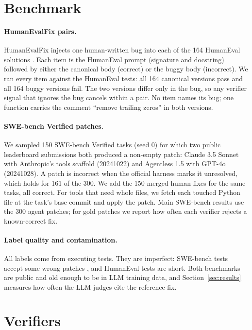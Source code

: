 \section{Benchmark}
\label{sec:bench}

\paragraph{HumanEvalFix pairs.}
HumanEvalFix \citep{muennighoff2024octopack} injects one human-written bug into each of the 164 HumanEval solutions \citep{chen2021humaneval}. Each item is the HumanEval prompt (signature and docstring) followed by either the canonical body (correct) or the buggy body (incorrect). We ran every item against the HumanEval tests: all 164 canonical versions pass and all 164 buggy versions fail. The two versions differ only in the bug, so any verifier signal that ignores the bug cancels within a pair. No item names its bug; one function carries the comment ``remove trailing zeros'' in both versions.

\paragraph{SWE-bench Verified patches.}
We sampled 150 SWE-bench Verified tasks \citep{jimenez2024swebench,openai2024sweverified} (seed 0) for which two public leaderboard submissions both produced a non-empty patch: Claude 3.5 Sonnet with Anthropic's tools scaffold (20241022) and Agentless 1.5 with GPT-4o (20241028). A patch is incorrect when the official harness marks it unresolved, which holds for 161 of the 300. We add the 150 merged human fixes for the same tasks, all correct. For tools that need whole files, we fetch each touched Python file at the task's base commit and apply the patch. Main SWE-bench results use the 300 agent patches; for gold patches we report how often each verifier rejects a known-correct fix.

\paragraph{Label quality and contamination.}
All labels come from executing tests. They are imperfect: SWE-bench tests accept some wrong patches \citep{patchdiff2025,utboost2025}, and HumanEval tests are short. Both benchmarks are public and old enough to be in LLM training data, and Section~\ref{sec:results} measures how often the LLM judges cite the reference fix.

\section{Verifiers}
\label{sec:verifiers}

